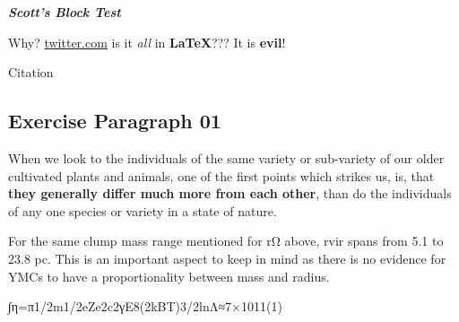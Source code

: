 \textit{\textbf{Scott's Block Test}} 

Why? \href{Why}{twitter.com} is it \textit{all} in \textbf{LaTeX}??? It is \textbf{evil}!

Citation\cite{Ferry_2006}

\subsection{Exercise Paragraph 01}

When we look to the individuals of the same variety or sub-variety of our older cultivated plants and animals, one of the first points which strikes us, is, that \textbf{they generally differ much more from each other}, than do the individuals of any one species or variety in a state of nature.

For the same clump mass range mentioned for rΩ above, rvir spans from 5.1 to 23.8 pc. This is an important aspect to keep in mind as there is no evidence for YMCs to have a proportionality between mass and radius. 

∫η=π1/2m1/2eZe2c2γE8(2kBT)3/2lnΛ≈7×1011(1)

